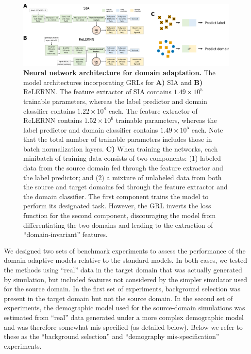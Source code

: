 \begin{figure}
    \centering
    \includegraphics[width=\textwidth]{DA_figs/DA_F2.PNG}
    \caption[Neural network architecture for domain adaptation.]{\textbf{Neural network architecture for domain adaptation.} The model architectures incorporating \acfp{GRL} for \textbf{A)} \ac{SIA} and \textbf{B)} ReLERNN. The feature extractor of \ac{SIA} contains $1.49 \times 10^5$ trainable parameters, whereas the label predictor and domain classifier contains $1.22 \times 10^8$ each. The feature extractor of ReLERNN contains $1.52 \times 10^6$ trainable parameters, whereas the label predictor and domain classifier contains $1.49 \times 10^5$ each. Note that the total number of trainable parameters includes those in batch normalization layers. \textbf{C)} When training the networks, each minibatch of training data consists of two components: (1) labeled data from the source domain fed through the feature extractor and the label predictor; and (2) a mixture of unlabeled data from both the source and target domains fed through the feature extractor and the domain classifier. The first component trains the model to perform its designated task. However, the \ac{GRL} inverts the loss function for the second component, discouraging the model from differentiating the two domains and leading to the extraction of “domain-invariant” features.}
    \label{fig:DA-F2}
\end{figure}

We designed two sets of benchmark experiments to assess the performance of the domain-adaptive models relative to the standard models. In both cases, we tested the methods using “real” data in the target domain that was actually generated by simulation, but included features not considered by the simpler simulator used for the source domain. In the first set of experiments, background selection was present in the target domain but not the source domain. In the second set of experiments, the demographic model used for the source-domain simulations was estimated from “real” data generated under a more complex demographic model and was therefore somewhat mis-specified (as detailed below). Below we refer to these as the “background selection” and “demography mis-specification” experiments.

